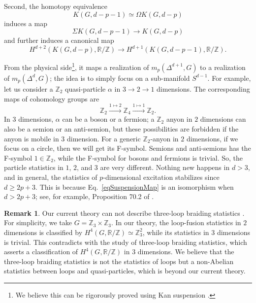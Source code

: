 \documentclass[reprint, amsmath, amssymb, showpacs, floatfix, longbibliography, aps, twocolumn, superscriptaddress, nofootinbib]{revtex4-2}
\newcommand{\ZZ}{{\mathbb Z}}
\newcommand{\RR}{{\mathbb R}}
\theoremstyle{definition}
\newtheorem{remark}{Remark}[section]
\begin{document}
Second, the homotopy equivalence
\begin{equation}
	K(G,d-p-1)\simeq \Omega K(G,d-p)
\end{equation}
induces a map 
\begin{equation}
	\Sigma K(G,d-p-1)\rightarrow K(G,d-p)
\end{equation}
and further induces a canonical map 
\begin{equation}\label{eqSuspensionMap}
	H^{d+2}(K(G,d-p),\RR/\ZZ)\rightarrow H^{d+1}(K(G,d-p-1),\RR/\ZZ).
\end{equation}

From the physical side\footnote{We believe this can be rigorously proved using Kan suspension \cite{goerss-2009}.}, it maps a realization of $m_p(\Delta^{d+1},G)$ to a realization of $m_p(\Delta^d,G)$; the idea is to simply focus on a sub-manifold $S^{d-1}$. For example, let us consider a $\ZZ_2$ quasi-particle $\alpha$ in $3\rightarrow2\rightarrow1$ dimensions. The corresponding maps of cohomology groups are
\begin{equation}
	\ZZ_2\xrightarrow{1\mapsto2}\ZZ_4\xrightarrow{1\mapsto1}\ZZ_2.
\end{equation}
 In $3$ dimensions, $\alpha$ can be a boson or a fermion; a $\ZZ_2$ anyon in $2$ dimensions can also be a semion or an anti-semion, but these possibilities are forbidden if the anyon is mobile in $3$ dimension. For a generic $\ZZ_2$-anyon in $2$ dimensions, if we focus on a circle, then we will get its F-symbol. Semions and anti-semions has the F-symbol $1\in \ZZ_2$, while the F-symbol for bosons and fermions is trivial. So, the particle statistics in $1$, $2$, and $3$ are very different. Nothing new happens in $d>3$, and in general, the statistics of $p$-dimensional excitation stabilizes since $d\ge 2p+3$. This is because Eq.~\eqref{eqSuspensionMap} is an isomorphism when $d>2p+3$; see, for example, Proposition 70.2 of \cite{miller}.
 
 \begin{remark}\label{remarkThreeLoop}
 	Our current theory can not describe three-loop braiding statistics \cite{Wang2014Braiding}. For simplicity, we take $G=\ZZ_3\times \ZZ_3$. In our theory, the loop-fusion statistics in $2$ dimensions is classified by $H^4(G,\RR/\ZZ)\simeq \ZZ_3^2$, while its statistics in $3$ dimensions is trivial. This contradicts with the study of three-loop braiding statistics, which asserts a classification of $H^4(G,\RR/\ZZ)$ in $3$ dimensions. We believe that the three-loop braiding statistics is not the statistics of loops but a non-Abelian statistics between loops and quasi-particles, which is beyond our current theory.
 \end{remark}
 
\end{document}

